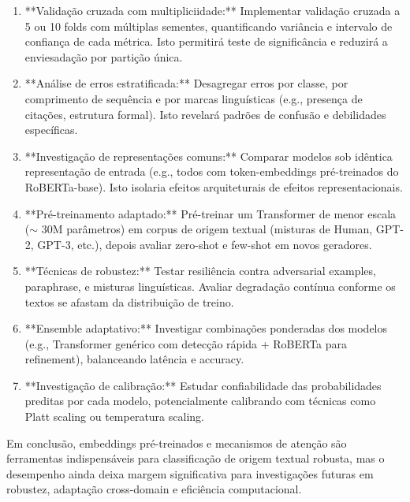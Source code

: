 \documentclass[runningheads]{llncs}
\begin{document}
\begin{enumerate}
    \item **Validação cruzada com multipliciidade:** Implementar validação cruzada a 5 ou 10 folds com múltiplas sementes, quantificando variância e intervalo de confiança de cada métrica. Isto permitirá teste de significância e reduzirá a enviesadação por partição única.
    
    \item **Análise de erros estratificada:** Desagregar erros por classe, por comprimento de sequência e por marcas linguísticas (e.g., presença de citações, estrutura formal). Isto revelará padrões de confusão e debilidades específicas.
    
    \item **Investigação de representações comuns:** Comparar modelos sob idêntica representação de entrada (e.g., todos com token-embeddings pré-treinados do RoBERTa-base). Isto isolaria efeitos arquiteturais de efeitos representacionais.
    
    \item **Pré-treinamento adaptado:** Pré-treinar um Transformer de menor escala ($\sim$ 30M parâmetros) em corpus de origem textual (misturas de Human, GPT-2, GPT-3, etc.), depois avaliar zero-shot e few-shot em novos geradores.
    
    \item **Técnicas de robustez:** Testar resiliência contra adversarial examples, paraphrase, e misturas linguísticas. Avaliar degradação contínua conforme os textos se afastam da distribuição de treino.
    
    \item **Ensemble adaptativo:** Investigar combinações ponderadas dos modelos (e.g., Transformer genérico com detecção rápida + RoBERTa para refinement), balanceando latência e accuracy.
    
    \item **Investigação de calibração:** Estudar confiabilidade das probabilidades preditas por cada modelo, potencialmente calibrando com técnicas como Platt scaling ou temperatura scaling.
\end{enumerate}

Em conclusão, embeddings pré-treinados e mecanismos de atenção são ferramentas indispensáveis para classificação de origem textual robusta, mas o desempenho ainda deixa margem significativa para investigações futuras em robustez, adaptação cross-domain e eficiência computacional.
\end{document}
